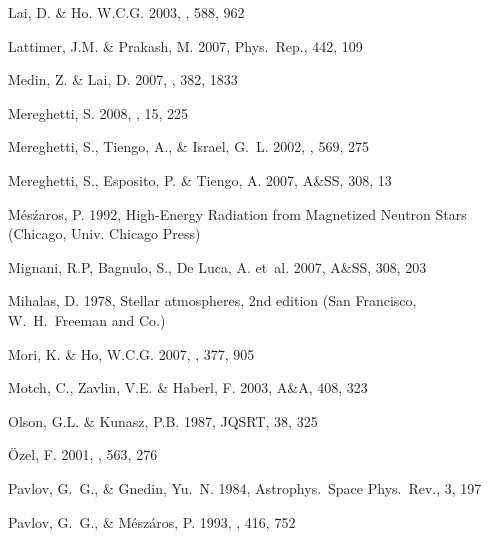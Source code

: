 \documentclass{aa}
\begin{document}
\begin{thebibliography}{}
{Lai}, D. \& Ho. W.C.G. 
2003, \apj, 588, 962 
 
{Lattimer}, J.M. \& {Prakash}, M. 2007, 
Phys.\ Rep., 442, 109 
 
{Medin}, Z. \& {Lai}, D. 2007, 
\mnras, 382, 1833 
 
{Mereghetti}, S. 2008, 
\aapr, 15, 225 
 
{Mereghetti}, S., {Tiengo}, A., \& {Israel}, G.~L. 2002, \apj, 569, 275 
 
{Mereghetti}, S., {Esposito}, P. \& {Tiengo}, A. 2007, 
 A\&SS, 308, 13 
 
{M\'es\'zaros}, P. 1992, {High-Energy Radiation from Magnetized Neutron Stars} 
(Chicago, Univ. Chicago Press) 
 
{Mignani}, R.P,  {Bagnulo}, S., {De Luca}, A. et~al. 
 2007,  A\&SS, 308, 203 
 
{Mihalas}, D. 1978, {Stellar atmospheres, 2nd edition} (San Francisco, 
  W.~H.~Freeman and Co.) 
 
 {Mori}, K. \& {Ho}, W.C.G. 
2007, \mnras, 377, 905 
 
 {Motch}, C., {Zavlin}, V.E. \& {Haberl}, F. 
2003, A\&A, 408, 323 
 
 {Olson}, G.L. \& {Kunasz}, P.B. 
1987, JQSRT, 38, 325 
 
{\"Ozel}, F. 2001, \apj, 563, 276 
 
 
{Pavlov}, G.~G., \& {Gnedin}, Yu.~N. 1984, 
Astrophys.\ Space Phys.\ Rev., 3, 197 
 
{Pavlov}, G.~G., \& {M\'esz\'aros}, P. 1993, 
\apj, 416, 752 
 

\end{thebibliography}
\end{document}
